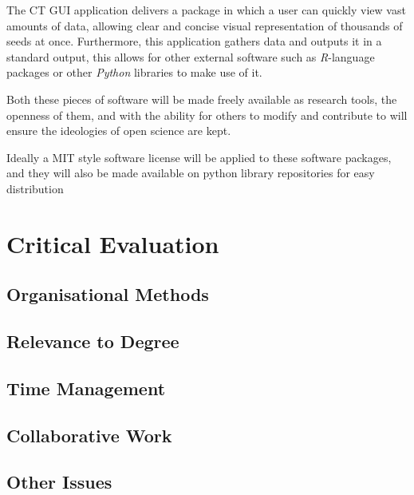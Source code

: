 \documentclass[11pt]{report}
\begin{document}
The CT GUI application delivers a package in which a user can quickly view vast amounts of data, allowing clear and concise visual representation of thousands of seeds at once. Furthermore, this application gathers data and outputs it in a standard output, this allows for other external software such as \emph{R}-language packages or other \emph{Python} libraries to make use of it.

Both these pieces of software will be made freely available as research tools, the openness of them, and with the ability for others to modify and contribute to will ensure the ideologies of open science are kept.

Ideally a MIT style software license will be applied to these software packages, and they will also be made available on python library repositories for easy distribution


\chapter{Critical Evaluation}
\label{sec:orga827f2e}
\section{Organisational Methods}
\label{sec:org4e9265f}
\section{Relevance to Degree}
\label{sec:org7966887}
\section{Time Management}
\label{sec:org12a41eb}
\section{Collaborative Work}
\label{sec:org2a79afc}
\section{Other Issues}
\label{sec:org843e18a}


\appendix
\end{document}
